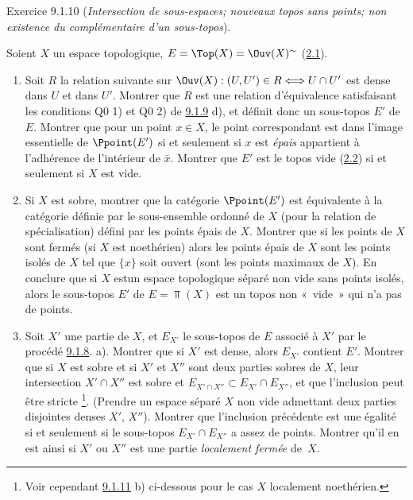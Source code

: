 \documentclass[10pt]{../fichiers-configuration-latex/smfart}
\begin{document}
\begin{enonce*}[remark]{Exercice 9.1.10}
(\emph{Intersection de sous-espaces; nouveaux topos sans points; non
existence du complémentaire d'un sous-topos}).

Soient $X$ un espace topologique, $E=\Top(X)=\Ouv(X)^{\sim}$
(\hyperref[IV.subsec2.1]{2.1}).

\begin{enumerate}
\renewcommand{\theenumi}{\alph{enumi}}
\renewcommand{\labelenumi}{\theenumi)}
\item Soit $R$ la relation suivante sur $\Ouv(X):(U,U')\in
R\Longleftrightarrow U\cap U'$ est dense dans $U$ et dans $U'$.
Montrer que $R$ est une relation d'équivalence satisfaisant les
conditions Q0 1) et Q0 2) de \hyperref[IV.exer9.1.9]{9.1.9} d), et définit donc
un sous-topos $E'$ de $E$. Montrer que pour un point $x\in X$, le
point correspondant est dans l'image essentielle de $\Ppoint(E')$ si
et seulement si $x$ est \emph{épais} \ie appartient à l'adhérence de
l'intérieur de $\bar{x}$. Montrer que $E'$ est le topos vide
(\hyperref[IV.subsec2.2]{2.2}) si et seulement si $X$ est vide.

\item Si $X$ est sobre, montrer que la catégorie $\Ppoint(E')$ est
équivalente à la catégorie définie par le sous-ensemble ordonné de
$X$ (pour la relation de spécialisation) défini par les points épais
de $X$. Montrer que si les points de $X$ sont fermés (\resp si $X$
est noethérien) alors les points épais de $X$ sont les points isolés
de $X$ \ie tel que $\{x\}$ soit ouvert (\resp sont les points
maximaux de $X$). En conclure que si $X$ est\pageoriginale un espace
topologique séparé non vide sans points isolés, alors le sous-topos
$E'$ de $E=\Top(X)$ est un topos non « vide »  qui n'a pas de
points.

\item Soit $X'$ une partie de $X$, et $E_{X'}$ le sous-topos de $E$
associé à $X'$ par le procédé \hyperref[IV.exer9.1.8]{9.1.8}. a). Montrer que si
$X'$ est dense, alors $E_{X'}$ contient $E'$. Montrer que si $X$ est
sobre et si $X'$ et $X''$ sont deux parties sobres de $X$, leur
intersection $X'\cap X''$ est sobre et $E_{X'\cap X''}\subset
E_{X'}\cap E_{X''}$, et que l'inclusion peut être stricte
\footnote[1]{Voir cependant \hyperref[IV.exer9.1.11]{9.1.11} b) ci-dessous pour
le cas $X$ localement noethérien.}. (Prendre un espace séparé $X$
non vide admettant deux parties disjointes denses $X'$, $X''$).
Montrer que l'inclusion précédente est une égalité si et seulement
si le sous-topos $E_{X'}\cap E_{X''}$ a assez de points. Montrer
qu'il en est ainsi si $X'$ ou $X''$ est une partie \emph{localement
fermée} de~$X$.


\end{enumerate}
\end{enonce*}
\end{document}
